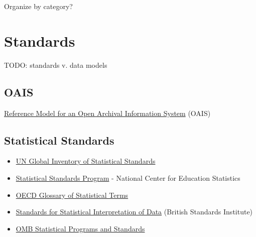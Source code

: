 \documentclass[reqno,12pt]{tufte-book}
\numberwithin{equation}{subsection}
\begin{document}
\begin{remark}
  Organize by category?
\end{remark}

\chapter{Standards}

\begin{ednote}
  TODO: standards v. data models
\end{ednote}

\section{OAIS}
\label{sect:oais}

\href{http://public.ccsds.org/publications/archive/650x0m2.pdf}{Reference
  Model for an Open Archival Information System} (OAIS)

\section{Statistical Standards}
\label{sect:statsstd}

\begin{itemize}
\item \href{http://unstats.un.org/unsd/iiss/List-of-Statistical-Standards.ashx}{UN
  Global Inventory of Statistical Standards}

\item \href{https://nces.ed.gov/statprog/standards.asp}{Statistical Standards Program} - National Center for Education Statistics

\item \href{https://stats.oecd.org/glossary/index.htm}{OECD Glossary of Statistical Terms}

\item \href{http://shop.bsigroup.com/Browse-By-Subject/Quality--Sampling/Full-list-of-statistical-standards/Statistical-interpretation-of-data/}{Standards for Statistical Interpretation of Data} (British Standards Institute)

\item \href{http://www.whitehouse.gov/omb/inforeg_statpolicy}{OMB Statistical Programs and Standards}

\end{itemize}
\end{document}
